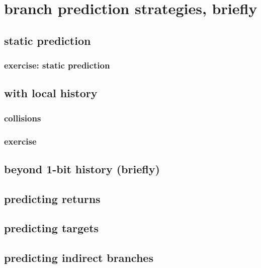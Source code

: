 \section{branch prediction strategies, briefly}

\subsection{static prediction}


\subsubsection{exercise: static prediction}


\subsection{with local history}


\subsubsection{collisions}


%

\subsubsection{exercise}


\subsection{beyond 1-bit history (briefly)}


\subsection{predicting returns}


\subsection{predicting targets}


\subsection{predicting indirect branches}

